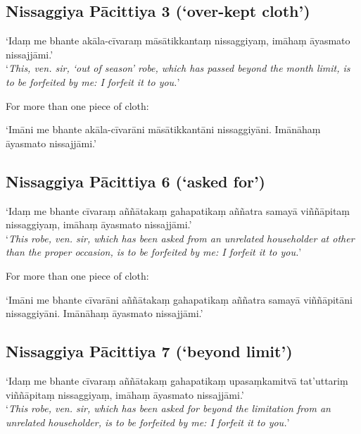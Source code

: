 \subsection{Nissaggiya Pācittiya 3 (‘over-kept cloth’)}

‘Idaṃ me bhante akāla-cīvaraṃ māsātikkantaṃ nissaggiyaṃ, imāhaṃ āyasmato nissajjāmi.’\\
‘\emph{This, ven. sir, ‘out of season’ robe, which has passed beyond the month
  limit, is to be forfeited by me: I forfeit it to you.}’\\
\mbox{}

For more than one piece of cloth:

‘Imāni me bhante akāla-cīvarāni māsātikkantāni nissaggiyāni. Imānāhaṃ āyasmato nissajjāmi.’


\subsection{Nissaggiya Pācittiya 6 (‘asked for’)}

‘Idaṃ me bhante cīvaraṃ aññātakaṃ gahapatikaṃ aññatra samayā viññāpitaṃ
nissaggiyaṃ, imāhaṃ āyasmato nissajjāmi.’\\
‘\emph{This robe, ven. sir, which has been asked from an unrelated householder at
  other than the proper occasion, is to be forfeited by me: I forfeit it to you.}’

For more than one piece of cloth:

‘Imāni me bhante cīvarāni aññātakaṃ gahapatikaṃ aññatra samayā viññāpitāni
nissaggiyāni. Imānāhaṃ āyasmato nissajjāmi.’


\subsection{Nissaggiya Pācittiya 7 (‘beyond limit’)}

‘Idaṃ me bhante cīvaraṃ aññātakaṃ gahapatikaṃ upasaṃkamitvā tat'uttariṃ
viññāpitaṃ nissaggiyaṃ, imāhaṃ āyasmato nissajjāmi.’\\
‘\emph{This robe, ven. sir, which has been asked for beyond the limitation from
  an unrelated householder, is to be forfeited by me: I forfeit it to you.}’

